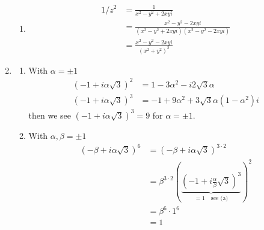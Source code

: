 \documentclass[10pt,a4paper]{book}
\theoremstyle{definition}
\begin{document}
\begin{enumerate}
\begin{enumerate}
\item\begin{align}
1/z^2&=\frac{1}{x^2-y^2+2xyi}\\
&=\frac{x^2-y^2-2xyi}{(x^2-y^2+2xyi)(x^2-y^2-2xyi)}\\
&=\frac{x^2-y^2-2xyi}{(x^2+y^2)^2}
\end{align}
\end{enumerate}
\item\begin{enumerate}
\item With $\alpha=\pm1$
\begin{align}
(-1+i\alpha\sqrt{3})^2
&=1-3\alpha^2-i2\sqrt{3}\alpha\\
(-1+i\alpha\sqrt{3})^3
&=-1+9\alpha^2+3\sqrt{3}\alpha(1-\alpha^2)i
\end{align}
then we see $(-1+i\alpha\sqrt{3})^3=9$ for $\alpha=\pm1$.

\item With $\alpha,\beta=\pm1$
\begin{align}
(-\beta+i\alpha\sqrt{3})^6&=(-\beta+i\alpha\sqrt{3})^{3\cdot2}\\
&=\beta^{3\cdot2}\left(\underbrace{\left(-1+i\frac{\alpha}{\beta}\sqrt{3}\right)^3}_{=1\quad\text{see (a)}}\right)^2\\
&=\beta^6\cdot 1^{6}\\
&=1
\end{align}
\end{enumerate}
\end{enumerate}
\end{document}
